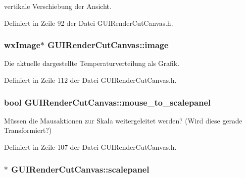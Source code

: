 vertikale Verschiebung der Ansicht. 



Definiert in Zeile 92 der Datei G\-U\-I\-Render\-Cut\-Canvas.\-h.

\hypertarget{classGUIRenderCutCanvas_a11ac45e65920dedf0cfbba21865dc2f9}{
\subsubsection[{image}]{\setlength{\rightskip}{0pt plus 5cm}wx\-Image$\ast$ G\-U\-I\-Render\-Cut\-Canvas\-::image\hspace{0.3cm}{\ttfamily [private]}}}\label{classGUIRenderCutCanvas_a11ac45e65920dedf0cfbba21865dc2f9}


Die aktuelle dargestellte Temperaturverteilung als Grafik. 



Definiert in Zeile 112 der Datei G\-U\-I\-Render\-Cut\-Canvas.\-h.

\hypertarget{classGUIRenderCutCanvas_a67247191a5442c586d32c9ef6cb1df2e}{
\subsubsection[{mouse\-\_\-to\-\_\-scalepanel}]{\setlength{\rightskip}{0pt plus 5cm}bool G\-U\-I\-Render\-Cut\-Canvas\-::mouse\-\_\-to\-\_\-scalepanel\hspace{0.3cm}{\ttfamily [private]}}}\label{classGUIRenderCutCanvas_a67247191a5442c586d32c9ef6cb1df2e}


Müssen die Mausaktionen zur Skala weitergeleitet werden? (Wird diese gerade Transformiert?) 



Definiert in Zeile 107 der Datei G\-U\-I\-Render\-Cut\-Canvas.\-h.

\hypertarget{classGUIRenderCutCanvas_a775d88069fbba36582815b477f929632}{
\subsubsection[{scalepanel}]{$\ast$ G\-U\-I\-Render\-Cut\-Canvas\-::scalepanel\hspace{0.3cm}{\ttfamily [private]}}}\label{classGUIRenderCutCanvas_a775d88069fbba36582815b477f929632}


